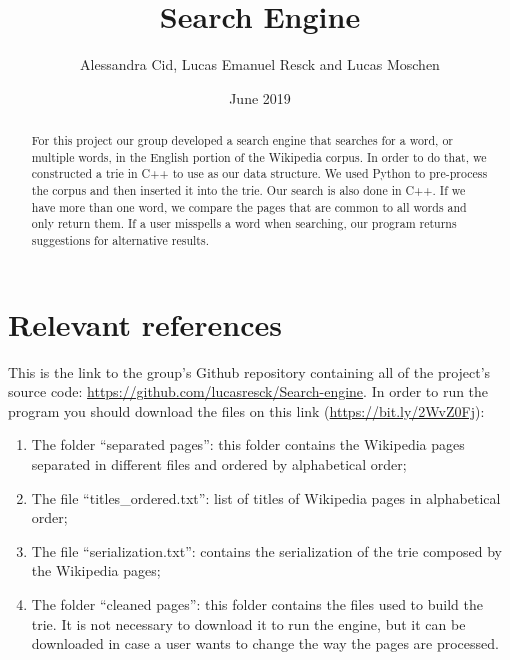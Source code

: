\documentclass{article}
\title{Search Engine}
\author{Alessandra Cid, Lucas Emanuel Resck  
and Lucas Moschen}
\date{June 2019}
\begin{document}
\maketitle

\begin{abstract}
For this project our group developed a search engine that searches for a word, or multiple words, in the English portion of the Wikipedia corpus. In order to do that, we constructed a trie in C++ to use as our data structure. We used Python to pre-process the corpus and then inserted it into the trie. Our search is also done in C++. If we have more than one word, we compare the pages that are common to all words and only return them. If a user misspells a word when searching, our program returns suggestions for alternative results. 
\end{abstract}

\section*{Relevant references}
This is the link to the group's Github repository containing all of the project's source code: \url{https://github.com/lucasresck/Search-engine}.
In order to run the program you should download the files on this link (\url{https://bit.ly/2WvZ0Fj}): 

\begin{enumerate}
\item The folder ``separated pages'': this folder contains the Wikipedia pages separated in different files and ordered by alphabetical order;

\item The file ``titles\_ordered.txt'': list of titles of Wikipedia pages in alphabetical order;

\item The file ``serialization.txt'': contains the serialization of the trie composed by the Wikipedia pages;

\item The folder ``cleaned pages'': this folder contains the files used to build the trie. It is not necessary to download it to run the engine, but it can be downloaded in case a user wants to change the way the pages are processed. 
 \end{enumerate}
\end{document}

